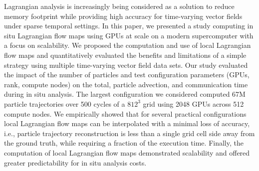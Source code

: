 Lagrangian analysis is increasingly being considered as a solution to reduce memory footprint while providing high accuracy for time-varying vector fields under sparse temporal settings.
%
%
In this paper, we presented a study computing in situ Lagrangian flow maps using GPUs at scale on a modern supercomputer with a focus on scalability.
%
%
We proposed the computation and use of local Lagrangian flow maps and quantitatively evaluated the benefits and limitations of a simple strategy using multiple time-varying vector field data sets.
%
Our study evaluated the impact of the number of particles and test configuration parameters (GPUs, rank, compute nodes) on the total, particle advection, and communication time during in situ analysis.
%
The largest configuration we considered computed 67M particle trajectories over 500 cycles of a $812^{3}$ grid using 2048 GPUs across 512 compute nodes.
%
We empirically showed that for several practical configurations local Lagrangian flow maps can be interpolated with a minimal loss of accuracy, i.e., particle trajectory reconstruction is less than a single grid cell side away from the ground truth, while requiring a fraction of the execution time. 
%
Finally, the computation of local Lagrangian flow maps demonstrated scalability and offered greater predictability for in situ analysis costs.
%
